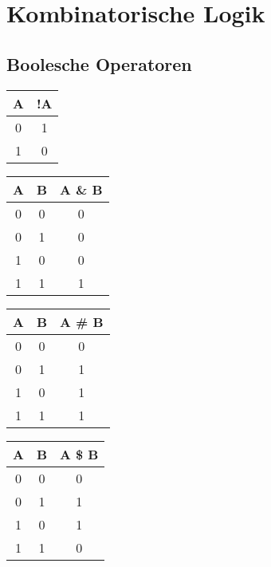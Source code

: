 \section{Kombinatorische Logik}\label{sec:kombinatorische-logik}

\subsection{Boolesche Operatoren}\label{subsec:boolesche-operatoren}

\begin{multicols}{4}
    \begin{center}
        \begin{tabular}{|c|c|}
            \hline
            A & !A \\
            \hline
            \hline
            0 & 1  \\
            1 & 0  \\
            \hline
        \end{tabular}
    \end{center}
    \begin{center}
        \begin{tabular}{|c|c|c|}
            \hline
            A & B & A \& B \\
            \hline
            \hline
            0 & 0 & 0      \\
            0 & 1 & 0      \\
            1 & 0 & 0      \\
            1 & 1 & 1      \\
            \hline
        \end{tabular}
    \end{center}
    \begin{center}
        \begin{tabular}{|c|c|c|}
            \hline
            A & B & A \# B \\
            \hline
            \hline
            0 & 0 & 0      \\
            0 & 1 & 1      \\
            1 & 0 & 1      \\
            1 & 1 & 1      \\
            \hline
        \end{tabular}
    \end{center}
    \begin{center}
        \begin{tabular}{|c|c|c|}
            \hline
            A & B & A \$ B \\
            \hline
            \hline
            0 & 0 & 0      \\
            0 & 1 & 1      \\
            1 & 0 & 1      \\
            1 & 1 & 0      \\
            \hline
        \end{tabular}
    \end{center}
\end{multicols}

